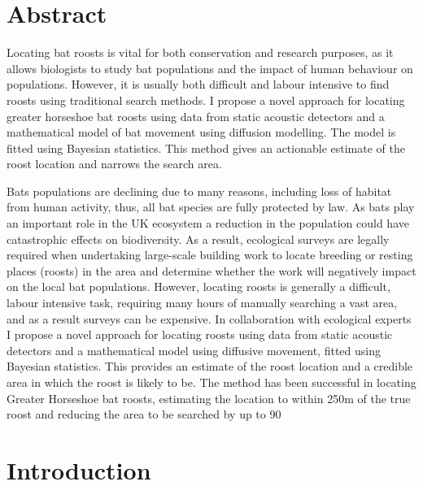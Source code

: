 \section{Abstract}

Locating bat roosts is vital for both conservation and research purposes, as it
allows biologists to study bat populations and the impact of human behaviour on
populations. However, it is usually both difficult and labour intensive to find
roosts using traditional search methods. I propose a novel approach for locating
greater horseshoe bat roosts using data from static acoustic detectors and a
mathematical model of bat movement using diffusion modelling. The model is
fitted using Bayesian statistics. This method gives an actionable estimate of
the roost location and narrows the search area.



Bats populations are declining due to many reasons, including loss of habitat from human activity, thus, all bat species are fully protected by law. As bats play an important role in the UK ecosystem a reduction in the population could have catastrophic effects on biodiversity. As a result, ecological surveys are legally required when undertaking large-scale building work to locate breeding or resting places (roosts) in the area and determine whether the work will negatively impact on the local bat populations. However, locating roosts is generally a difficult, labour intensive task, requiring many hours of manually searching a vast area, and as a result surveys can be expensive. In collaboration with ecological experts I propose a novel approach for locating roosts using data from static acoustic detectors and a mathematical model using diffusive movement, fitted using Bayesian statistics. This provides an estimate of the roost location and a credible area in which the roost is likely to be. The method has been successful in locating Greater Horseshoe bat roosts, estimating the location to within 250m of the true roost and reducing the area to be searched by up to 90%

	\section{Introduction}

